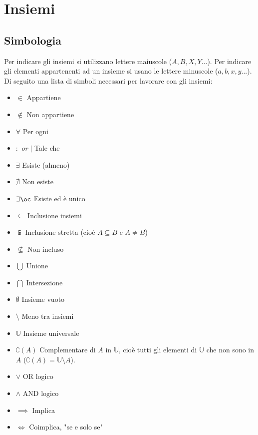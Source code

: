\section{Insiemi}
\subsection{Simbologia}
Per indicare gli insiemi si utilizzano lettere maiuscole ($A, B, X, Y ...$). Per indicare gli elementi appartenenti ad un insieme si usano le lettere minuscole ($a, b, x, y ...$). Di seguito una lista di simboli necessari per lavorare con gli insiemi:

\begin{itemize}
    \item $\in$ \qquad Appartiene
    \item $\notin$ \qquad Non appartiene
    \item $\forall$ \qquad Per ogni
    \item $:$ \textit{or} $|$ \qquad Tale che
    \item $\exists$ \qquad Esiste (almeno)
    \item $\nexists$ \qquad Non esiste
    \item $\exists \oc$ \qquad Esiste ed è unico
    
    \item $\subseteq$ \qquad Inclusione insiemi
    \item $\subsetneqq$ \qquad Inclusione stretta (cioè $A \subseteq B$ e $A \neq B$)
    \item $\nsubseteq$ \qquad Non incluso
    
    \item $\bigcup$ \qquad Unione
    \item $\bigcap$ \qquad Intersezione
    \item $\emptyset$ \qquad Insieme vuoto
    \item $\setminus$ \qquad Meno tra insiemi
    \item $\mathbb{U}$ \qquad Insieme universale
    \item $\complement \left(A\right)$ \qquad Complementare di $A$ in $\mathbb{U}$, cioè tutti gli elementi di $\mathbb{U}$ che non sono in $A$ ($\complement \left(A\right) = \mathbb{U} \setminus A$).
    
    \item $\lor$ \qquad OR logico
    \item $\land$ \qquad AND logico
    \item $\implies$ \qquad Implica
    \item $\iff$ \qquad Coimplica, "se e solo se" 
\end{itemize}

